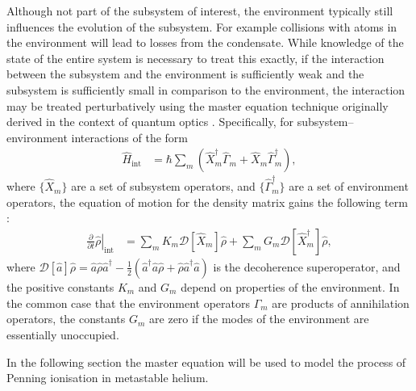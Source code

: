 Although not part of the subsystem of interest, the environment typically still influences the evolution of the subsystem.  For example collisions with atoms in the environment will lead to losses from the condensate.  While knowledge of the state of the entire system is necessary to treat this exactly, if the interaction between the subsystem and the environment is sufficiently weak and the subsystem is sufficiently small in comparison to the environment, the interaction may be treated perturbatively using the master equation technique originally derived in the context of quantum optics \citep{Senitzky:1960,Senitzky:1961}.  Specifically, for subsystem--environment interactions of the form
\begin{align}
    \hat{H}_\text{int} &= \hbar \sum_m \left(\hat{X}_m^\dagger \hat{\Gamma}_m^{\phantom{\dagger}} + \hat{X}_m^{\phantom{\dagger}} \hat{\Gamma}_m^\dagger \right), \label{BackgroundTheory:GeneralSubsystemEnvironmentCoupling}
\end{align}
where $\{\hat{X}_m\}$ are a set of subsystem operators, and $\{\hat{\Gamma}_m^\dagger\}$ are a set of environment operators, the equation of motion for the density matrix gains the following term \citep[Chapter 5]{GardinerQN}:
\begin{align}
    \left.\frac{\partial}{\partial t} \hat{\rho}\right|_\text{int} &= \sum_m K_m \mathcal{D}[\hat{X}_m]\hat{\rho} + \sum_m G_m \mathcal{D}[\hat{X}_m^\dagger]\hat{\rho}, \label{BackgroundTheory:LindbladForm}
\end{align}
where $\mathcal{D}[\hat{a}]\hat{\rho} = \hat{a} \hat{\rho} \hat{a}^\dagger - \frac{1}{2}\left(\hat{a}^\dagger \hat{a} \hat{\rho} + \hat{\rho} \hat{a}^\dagger \hat{a} \right)$ is the decoherence superoperator, and the positive constants $K_m$ and $G_m$ depend on properties of the environment.  In the common case that the environment operators $\hat{\Gamma}_m$ are products of annihilation operators, the constants $G_m$ are zero if the modes of the environment are essentially unoccupied.

In the following section the master equation will be used to model the process of Penning ionisation in metastable helium.

